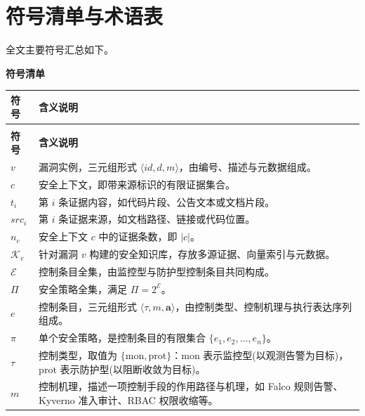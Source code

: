 
\begingroup
\setlength{\parskip}{0.2em}

\chapter*{符号清单与术语表}\label{chap:sym-list}

全文主要符号汇总如下。

{\noindent\large\textbf{符号清单}\par}
\vspace{0.2em}

\begingroup
\small
\setlength{\tabcolsep}{4pt}
\renewcommand{\arraystretch}{0.88}
\begin{longtable}{>{\centering\arraybackslash}p{2.9cm} >{\raggedright\arraybackslash}p{10.5cm}}
\toprule
\textbf{符号} & \textbf{含义说明} \\
\midrule
\endfirsthead
\multicolumn{2}{c}{\small\textbf{符号清单（续）}} \\[0.3ex]
\toprule
\textbf{符号} & \textbf{含义说明} \\
\midrule
\endhead
\midrule
\endfoot
\bottomrule
\endlastfoot
$v$ & 漏洞实例，三元组形式 $\langle \mathit{id},d,m \rangle$，由编号、描述与元数据组成。 \\
$c$ & 安全上下文，即带来源标识的有限证据集合。 \\
$t_i$ & 第 $i$ 条证据内容，如代码片段、公告文本或文档片段。 \\
$\mathit{src}_i$ & 第 $i$ 条证据来源，如文档路径、链接或代码位置。 \\
$n_c$ & 安全上下文 $c$ 中的证据条数，即 $|c|$。 \\
$\mathcal{K}_v$ & 针对漏洞 $v$ 构建的安全知识库，存放多源证据、向量索引与元数据。 \\
$\mathcal{E}$ & 控制条目全集，由监控型与防护型控制条目共同构成。 \\
$\Pi$ & 安全策略全集，满足 $\Pi=2^{\mathcal{E}}$。 \\
$e$ & 控制条目，三元组形式 $\langle \tau,m,\mathbf{a} \rangle$，由控制类型、控制机理与执行表达序列组成。 \\
$\pi$ & 单个安全策略，是控制条目的有限集合 $\{e_1,e_2,\ldots,e_n\}$。 \\
$\tau$ & 控制类型，取值为 $\{\mathrm{mon},\mathrm{prot}\}$：$\mathrm{mon}$ 表示监控型(以观测告警为目标)，$\mathrm{prot}$ 表示防护型(以阻断收敛为目标)。 \\
$m$ & 控制机理，描述一项控制手段的作用路径与机理，如 Falco 规则告警、Kyverno 准入审计、RBAC 权限收缩等。 \\

\end{longtable}
